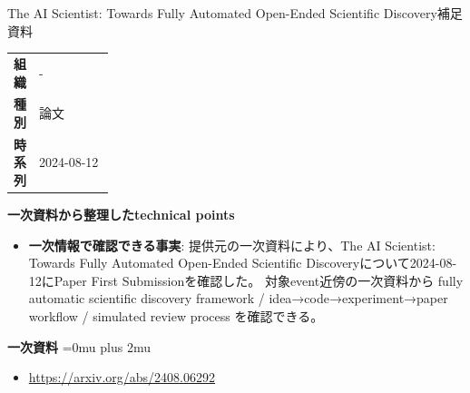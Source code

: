 \begin{technicalnote}{The AI Scientist: Towards Fully Automated Open-Ended Scientific Discovery}{補足資料}
\begingroup
\begin{tabularx}{\linewidth}{@{}>{\bfseries}p{0.22\linewidth}X@{}}
組織 & - \\
種別 & 論文 \\
時系列 & 2024-08-12 \\
\end{tabularx}
\smallskip
{\bfseries 一次資料から整理したtechnical points}
\begin{itemize}[leftmargin=1.5em,itemsep=0.35em]
\item \textbf{一次情報で確認できる事実}: 提供元の一次資料により、The AI Scientist: Towards Fully Automated Open-Ended Scientific Discoveryについて2024-08-12にPaper First Submissionを確認した。 対象event近傍の一次資料から fully automatic scientific discovery framework / idea→code→experiment→paper workflow / simulated review process を確認できる。
\end{itemize}
\begin{minipage}{\linewidth}
\begin{samepage}
{\bfseries 一次資料}
\begingroup\sloppy
\Urlmuskip=0mu plus 2mu\relax
\begin{itemize}[leftmargin=1.5em,itemsep=0.25em]
\item {\scriptsize\url{https://arxiv.org/abs/2408.06292}}
\end{itemize}
\endgroup
\end{samepage}
\end{minipage}
\endgroup
\end{technicalnote}
\medskip
